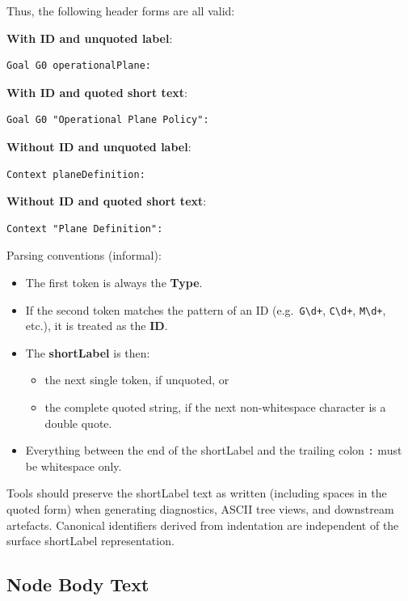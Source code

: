 \documentclass[11pt]{article}
\begin{document}
Thus, the following header forms are all valid:

\textbf{With ID and unquoted label}:
\begin{verbatim}
Goal G0 operationalPlane:
\end{verbatim}

\textbf{With ID and quoted short text}:
\begin{verbatim}
Goal G0 "Operational Plane Policy":
\end{verbatim}

\textbf{Without ID and unquoted label}:
\begin{verbatim}
Context planeDefinition:
\end{verbatim}

\textbf{Without ID and quoted short text}:
\begin{verbatim}
Context "Plane Definition":
\end{verbatim}

Parsing conventions (informal):

\begin{itemize}[leftmargin=2em]
  \item The first token is always the \textbf{Type}.
  \item If the second token matches the pattern of an ID (e.g.\ \texttt{G\textbackslash d+}, \texttt{C\textbackslash d+}, \texttt{M\textbackslash d+}, etc.), it is treated as the \textbf{ID}.
  \item The \textbf{shortLabel} is then:
  \begin{itemize}[leftmargin=1.5em]
    \item the next single token, if unquoted, or
    \item the complete quoted string, if the next non-whitespace character is a double quote.
  \end{itemize}
  \item Everything between the end of the shortLabel and the trailing colon \texttt{:} must be whitespace only.
\end{itemize}

Tools should preserve the shortLabel text as written (including spaces in the quoted form) when generating diagnostics, ASCII tree views, and downstream artefacts. Canonical identifiers derived from indentation are independent of the surface shortLabel representation.

\subsection{Node Body Text}
\end{document}
